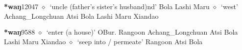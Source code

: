   \begin{list}{}{\leftmargin=1.5em \itemindent=-1.5em}
  \item {\footnotesize \textbf{*waŋ}}{\tiny 12047}
         $\diamond$~`uncle (father's sister's husband)nd'
         Bola 
\hspace{1ex}
         Lashi 
\hspace{1ex}
         Maru 
\hspace{1ex}
         $\diamond$~`west'
         Achang\_Longchuan 
\hspace{1ex}
         Atsi 
\hspace{1ex}
         Bola 
\hspace{1ex}
         Lashi 
\hspace{1ex}
         Maru 
\hspace{1ex}
         Xiandao 
  \item {\footnotesize \textbf{*waŋ}}{\tiny 9588}
\hspace{1ex}
         $\diamond$~`enter (a house)'
         OBur. 
\hspace{1ex}
         Rangoon 
\hspace{1ex}
         Achang\_Longchuan 
\hspace{1ex}
         Atsi 
\hspace{1ex}
         Bola 
\hspace{1ex}
         Lashi 
\hspace{1ex}
         Maru 
\hspace{1ex}
         Xiandao 
\hspace{1ex}
         $\diamond$~`seep into / permeate'
         Rangoon 
\hspace{1ex}
         Atsi 
\hspace{1ex}
         Bola 

\end{list}
